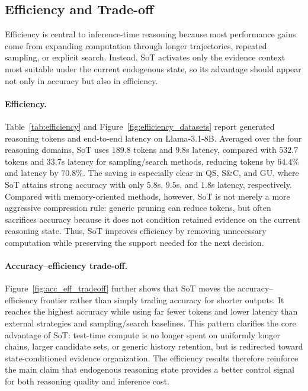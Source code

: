     \vspace{-3.0mm}

    \subsection{Efficiency and Trade-off}
    \label{sec:efficiency}
    \vspace{-0.5mm}
    
    Efficiency is central to inference-time reasoning because most performance gains come from expanding computation through longer trajectories, repeated sampling, or explicit search. Instead, SoT activates only the evidence context most suitable under the current endogenous state, so its advantage should appear not only in accuracy but also in efficiency.

    \vspace{-1.0mm}
    \paragraph{Efficiency.}
    Table~\ref{tab:efficiency} and Figure~\ref{fig:efficiency_datasets} report generated reasoning tokens and end-to-end latency on Llama-3.1-8B. Averaged over the four reasoning domains, SoT uses \(189.8\) tokens and \(9.8\)s latency, compared with \(532.7\) tokens and \(33.7\)s latency for sampling/search methods, reducing tokens by \(64.4\%\) and latency by \(70.8\%\). The saving is especially clear in QS, S\&C, and GU, where SoT attains strong accuracy with only \(5.8\)s, \(9.5\)s, and \(1.8\)s latency, respectively. Compared with memory-oriented methods, however, SoT is not merely a more aggressive compression rule: generic pruning can reduce tokens, but often sacrifices accuracy because it does not condition retained evidence on the current reasoning state. Thus, SoT improves efficiency by removing unnecessary computation while preserving the support needed for the next decision.

    \vspace{-1.0mm}
    \paragraph{Accuracy--efficiency trade-off.}
    Figure~\ref{fig:acc_eff_tradeoff} further shows that SoT moves the accuracy--efficiency frontier rather than simply trading accuracy for shorter outputs. It reaches the highest  accuracy while using far fewer tokens and lower latency than external strategies and sampling/search baselines. This pattern clarifies the core advantage of SoT: test-time compute is no longer spent on uniformly longer chains, larger candidate sets, or generic history retention, but is redirected toward state-conditioned evidence organization. The efficiency results therefore reinforce the main claim that endogenous reasoning state provides a better control signal for both reasoning quality and inference cost.
    
